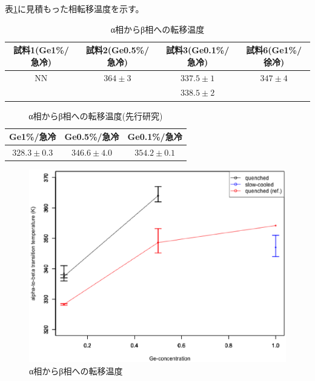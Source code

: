 表\ref{tab:transT}に見積もった相転移温度を示す。
\begin{table}[htb]
  \begin{center}
  \begin{tabular}{cccc}
    試料1(Ge1\%/急冷) & 試料2(Ge0.5\%/急冷) & 試料3(Ge0.1\%/急冷)& 試料6(Ge1\%/徐冷) \\ \hline
    NN & $364\pm3$ & $337.5\pm1$ & $347\pm4$ \\
     &                & $338.5\pm2$ &                \\
  \end{tabular}
  \caption{α相からβ相への転移温度}
  \label{tab:transT}
    \end{center}
\end{table}

\begin{table}[htb]
    \begin{center}
  \begin{tabular}{ccc}
    Ge1\%/急冷 & Ge0.5\%/急冷 & Ge0.1\%/急冷  \\ \hline
    $328.3\pm0.3$ & $346.6\pm4.0$ & $354.2\pm0.1$ \\
  \end{tabular}
  \caption{α相からβ相への転移温度(先行研究\cite{})}
  \label{tab:transT_ref}
    \end{center}
\end{table}

\begin{figure}[htb]
    \begin{center}
   \includegraphics[width=130mm]{results_discussions/TransitionT.eps}
  \end{center}
  \caption{α相からβ相への転移温度}
  \label{fig:TransitionT}
\end{figure}

